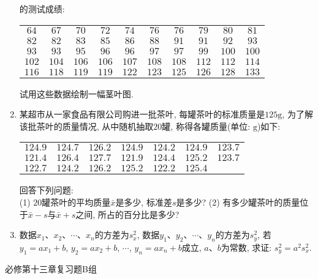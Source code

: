 \documentclass[10pt,a4paper]{article}
\begin{document}
\begin{enumerate}[1.]
的测试成绩:
\begin{center}
    \begin{tabular}{cccccccccc}
        $64$ & $67$ & $70$ & $72$ & $74$ & $76$ & $76$ & $79$ & $80$ & $81$ \\
        $82$ & $82$ & $83$ & $85$ & $86$ & $88$ & $91$ & $91$ & $92$ & $93$ \\
        $93$ & $93$ & $95$ & $96$ & $96$ & $97$ & $97$ & $99$ & $100$ & $100$ \\
        $102$ & $104$ & $106$ & $106$ & $107$ & $108$ & $108$ & $112$ & $112$ & $114$ \\
        $116$ & $118$ & $119$ & $119$ & $122$ & $123$ & $125$ & $126$ & $128$ & $133$
    \end{tabular}
\end{center}
试用这些数据绘制一幅茎叶图.
\vspace*{3cm}
\item 某超市从一家食品有限公司购进一批茶叶, 每罐茶叶的标准质量是$125\text{g}$, 为了解该批茶叶的质量情况, 从中随机抽取$20$罐, 称得各罐质量(单位: $\text{g}$)如下:
\begin{center}
    \begin{tabular}{ccccccc}
        $124.9$ & $124.7$ & $126.2$ & $124.9$ & $124.2$ & $124.9$ & $123.7$ \\
        $121.4$ & $126.4$ & $127.7$ & $121.9$ & $124.4$ & $125.2$ & $123.7$ \\
        $122.7$ & $124.2$ & $126.2$ & $125.2$ & $122.2$ & $125.4$
    \end{tabular}
\end{center}
回答下列问题:\\
(1) $20$罐茶叶的平均质量$\bar{x}$是多少, 标准差$s$是多少?
(2) 有多少罐茶叶的质量位于$\bar x-s$与$\bar x +s$之间, 所占的百分比是多少?
\vspace*{3cm}
\item 数据$x_1$、$x_2$、$\cdots$、$x_n$的方差为$s_x^2$, 数据$y_1$、$y_2$、$\cdots$、$y_n$的方差为$s_y^2$, 若$y_1=ax_1+b$, $y_2=ax_2+b$, $\cdots$, $y_n=ax_n+b$成立, $a$、$b$为常数, 求证: $s_y^2=a^2s_x^2$. 
\vspace*{3cm}
\end{enumerate}


必修第十三章复习题B组
\end{document}
